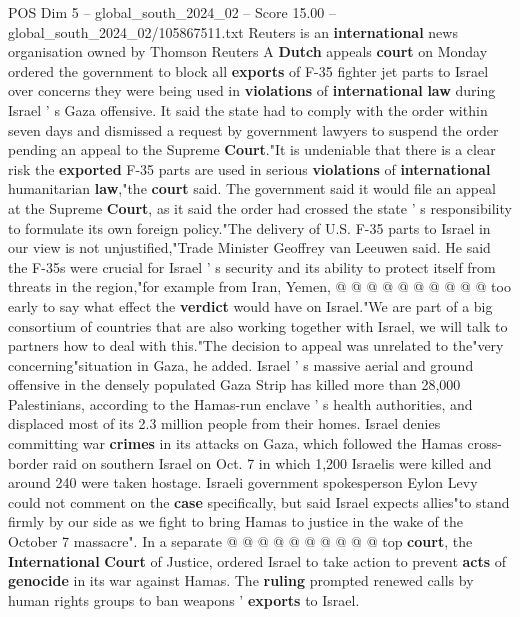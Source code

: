 \begin{textsample}{POS Dim 5 – global\_south\_2024\_02 – Score 15.00 – global\_south\_2024\_02/105867511.txt}  \label{ex:f5_pos_155}
Reuters is an \textbf{international} news organisation owned by Thomson Reuters A \textbf{Dutch} appeals \textbf{court} on Monday ordered the government to block all \textbf{exports} of F-35 fighter jet parts to Israel over concerns they were being used in \textbf{violations} of \textbf{international} \textbf{law} during Israel ' s Gaza offensive.
It said the state had to comply with the order within seven days and dismissed a request by government lawyers to suspend the order pending an appeal to the Supreme \textbf{Court}."It is undeniable that there is a clear risk the \textbf{exported} F-35 parts are used in serious \textbf{violations} of \textbf{international} humanitarian \textbf{law},"the \textbf{court} said.
The government said it would file an appeal at the Supreme \textbf{Court}, as it said the order had crossed the state ' s responsibility to formulate its own foreign policy."The delivery of U.S.
F-35 parts to Israel in our view is not unjustified,"Trade Minister Geoffrey van Leeuwen said.
He said the F-35s were crucial for Israel ' s security and its ability to protect itself from threats in the region,"for example from Iran, Yemen, @ @ @ @ @ @ @ @ @ @ too early to say what effect the \textbf{verdict} would have on Israel."We are part of a big consortium of countries that are also working together with Israel, we will talk to partners how to deal with this."The decision to appeal was unrelated to the"very concerning"situation in Gaza, he added.
Israel ' s massive aerial and ground offensive in the densely populated Gaza Strip has killed more than 28,000 Palestinians, according to the Hamas-run enclave ' s health authorities, and displaced most of its 2.3 million people from their homes.
Israel denies committing war \textbf{crimes} in its attacks on Gaza, which followed the Hamas cross-border raid on southern Israel on Oct. 7 in which 1,200 Israelis were killed and around 240 were taken hostage.
Israeli government spokesperson Eylon Levy could not comment on the \textbf{case} specifically, but said Israel expects allies"to stand firmly by our side as we fight to bring Hamas to justice in the wake of the October 7 massacre".
In a separate @ @ @ @ @ @ @ @ @ @ top \textbf{court}, the \textbf{International} \textbf{Court} of Justice, ordered Israel to take action to prevent \textbf{acts} of \textbf{genocide} in its war against Hamas.
The \textbf{ruling} prompted renewed calls by human rights groups to ban weapons ' \textbf{exports} to Israel.

\end{textsample}
